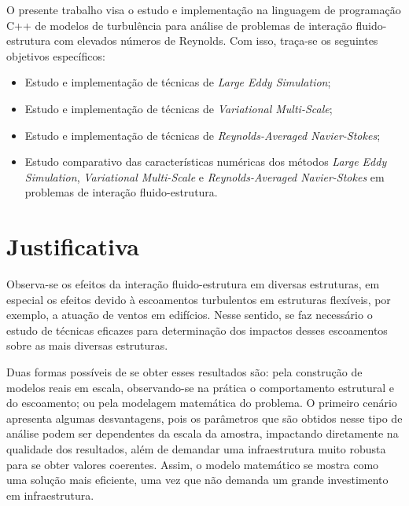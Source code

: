 \documentclass[_ArquivoPrincipal.tex]{subfiles}
\begin{document}
O presente trabalho visa o estudo e implementação na linguagem de programação C++ de modelos de turbulência para análise de problemas de interação fluido-estrutura com elevados números de Reynolds. Com isso, traça-se os seguintes objetivos específicos:

\begin{itemize}
    \item Estudo e implementação de técnicas de \textit{Large Eddy Simulation};

    \item Estudo e implementação de técnicas de \textit{Variational Multi-Scale};

    \item Estudo e implementação de técnicas de \textit{Reynolds-Averaged Navier-Stokes};

    \item Estudo comparativo das características numéricas dos métodos \textit{Large Eddy Simulation}, \textit{Variational Multi-Scale} e \textit{Reynolds-Averaged Navier-Stokes} em problemas de interação fluido-estrutura.
\end{itemize}

\section{Justificativa}

Observa-se os efeitos da interação fluido-estrutura em diversas estruturas, em especial os efeitos devido à escoamentos turbulentos em estruturas flexíveis, por exemplo, a atuação de ventos em edifícios. Nesse sentido, se faz necessário o estudo de técnicas eficazes para determinação dos impactos desses escoamentos sobre as mais diversas estruturas.

Duas formas possíveis de se obter esses resultados são: pela construção de modelos reais em escala, observando-se na prática o comportamento estrutural e do escoamento; ou pela modelagem matemática do problema. O primeiro cenário apresenta algumas desvantagens, pois os parâmetros que são obtidos nesse tipo de análise podem ser dependentes da escala da amostra, impactando diretamente na qualidade dos resultados, além de demandar uma infraestrutura muito robusta para se obter valores coerentes. Assim, o modelo matemático se mostra como uma solução mais eficiente, uma vez que não demanda um grande investimento em infraestrutura.
\end{document}
